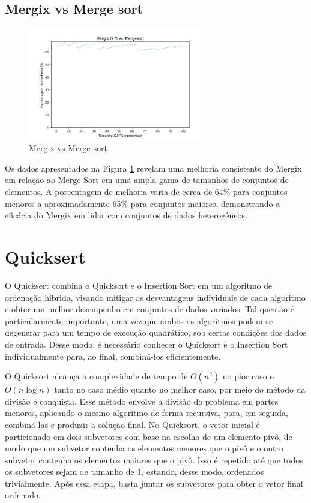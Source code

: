 \documentclass[12pt]{article}
\begin{document}
\subsection{ Mergix vs Merge sort}

\begin{figure}[h]
    \centering
    \includegraphics[width=0.7\textwidth]{mergix_vs_mergesort.png}
    \caption{Mergix vs Merge sort}
    \label{fig:mergexmergix}
\end{figure}

Os dados apresentados na Figura \ref{fig:mergexmergix} revelam uma melhoria consistente do Mergix em relação ao Merge Sort em uma ampla gama de tamanhos de conjuntos de elementos. A porcentagem de melhoria varia de cerca de 64\% para conjuntos menores a aproximadamente 65\% para conjuntos maiores, demonstrando a eficácia do Mergix em lidar com conjuntos de dados heterogêneos.

    

\section{Quicksert}  \label{sec:firstpage}

O Quicksert combina o Quicksort e o Insertion Sort em um algoritmo de ordenação híbrida, visando mitigar as desvantagens individuais de cada algoritmo e obter um melhor desempenho em conjuntos de dados variados. Tal questão é particularmente importante, uma vez que ambos os algoritmos podem se degenerar para um tempo de execução quadrático, sob certas condições dos dados de entrada. Desse modo, é necessário conhecer o Quicksort e o Insertion Sort individualmente para, ao final, combiná-los eficientemente.

O Quicksort alcança a complexidade de tempo de $O(n^2)$ no pior caso e $O(n \log{n})$ tanto no caso médio quanto no melhor caso, por meio do método da divisão e conquista. Esse método envolve a divisão do problema em partes menores, aplicando o mesmo algoritmo de forma recursiva, para, em seguida, combiná-las e produzir a solução final. No Quicksort, o vetor inicial é particionado em dois subvetores com base na escolha de um elemento pivô, de modo que um subvetor contenha os elementos menores que o pivô e o outro subvetor contenha os elementos maiores que o pivô. Isso é repetido até que todos os subvetores sejam de tamanho de 1, estando, desse modo, ordenados trivialmente. Após essa etapa, basta juntar os subvetores para obter o vetor final ordenado.
\end{document}
